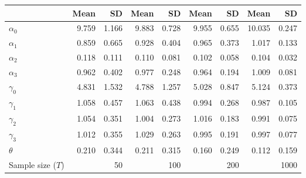 
\begin{tabular}[t]{lrrrrrrrr}
\toprule
  & Mean & SD & Mean  & SD  & Mean   & SD   & Mean    & SD   \\
\midrule
$\alpha_{0}$ & 9.759 & 1.166 & 9.883 & 0.728 & 9.955 & 0.655 & 10.035 & 0.247\\
$\alpha_{1}$ & 0.859 & 0.665 & 0.928 & 0.404 & 0.965 & 0.373 & 1.017 & 0.133\\
$\alpha_{2}$ & 0.118 & 0.111 & 0.110 & 0.081 & 0.102 & 0.058 & 0.104 & 0.032\\
$\alpha_{3}$ & 0.962 & 0.402 & 0.977 & 0.248 & 0.964 & 0.194 & 1.009 & 0.081\\
$\gamma_{0}$ & 4.831 & 1.532 & 4.788 & 1.257 & 5.028 & 0.847 & 5.124 & 0.373\\
$\gamma_{1}$ & 1.058 & 0.457 & 1.063 & 0.438 & 0.994 & 0.268 & 0.987 & 0.105\\
$\gamma_{2}$ & 1.054 & 0.351 & 1.004 & 0.273 & 1.016 & 0.183 & 0.991 & 0.075\\
$\gamma_{3}$ & 1.012 & 0.355 & 1.029 & 0.263 & 0.995 & 0.191 & 0.997 & 0.077\\
$\theta$ & 0.210 & 0.344 & 0.211 & 0.315 & 0.160 & 0.249 & 0.112 & 0.159\\
Sample size ($T$) &  & 50 &  & 100 &  & 200 &  & 1000\\
\bottomrule
\end{tabular}
